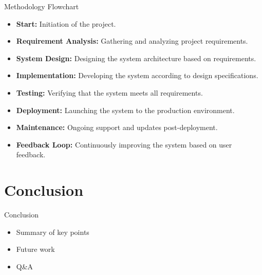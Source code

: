 \documentclass{beamer}
\begin{document}
\begin{frame}{Methodology Flowchart}
\begin{center}
    \end{center}
    \vspace{0.5cm}
    \begin{itemize}
        \item \textbf{Start:} Initiation of the project.
        \item \textbf{Requirement Analysis:} Gathering and analyzing project requirements.
        \item \textbf{System Design:} Designing the system architecture based on requirements.
        \item \textbf{Implementation:} Developing the system according to design specifications.
        \item \textbf{Testing:} Verifying that the system meets all requirements.
        \item \textbf{Deployment:} Launching the system to the production environment.
        \item \textbf{Maintenance:} Ongoing support and updates post-deployment.
        \item \textbf{Feedback Loop:} Continuously improving the system based on user feedback.
    \end{itemize}
\end{frame}

\section{Conclusion}
\begin{frame}{Conclusion}
    \begin{itemize}
        \item Summary of key points
        \item Future work
        \item Q\&A
    \end{itemize}
\end{frame}
\end{document}
